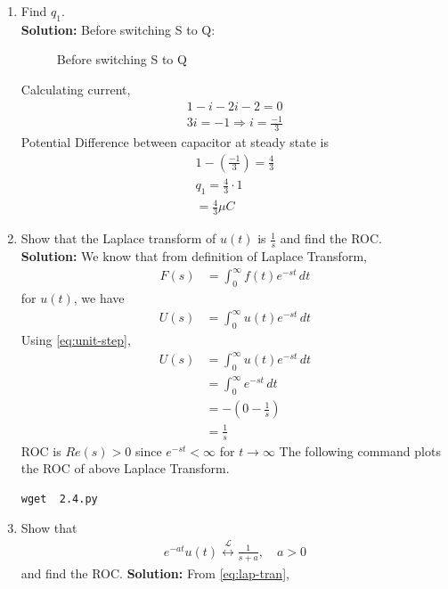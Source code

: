 \documentclass[journal,12pt,twocolumn]{IEEEtran}
\newcommand{\solution}{\noindent \textbf{Solution: }}
\providecommand{\brak}[1]{\ensuremath{\left(#1\right)}}
\providecommand{\system}[1]{\overset{\mathcal{#1}}{ \longleftrightarrow}}
\numberwithin{equation}{section}
\renewcommand\thesection{\arabic{section}}
\begin{document}
\begin{enumerate}[label=\arabic*.,ref=\thesection.\theenumi]
\item Find $q_1$.\\
\solution
Before switching S to Q:
\begin{figure}
%   
\caption{Before switching S to Q}
\end{figure}
Calculating current,
\begin{align}
1-i-2i-2=0\\
3i=-1 \Rightarrow i=\frac{-1}{3}
\end{align}
Potential Difference between capacitor at steady state is
\begin{align}
1-\brak{\frac{-1}{3}}=\frac{4}{3}\\
q_1=\frac{4}{3} \cdot 1\\
=\frac{4}{3} \mu C
\end{align}
	\item Show that the Laplace transform of $u(t)$ is $\frac{1}{s}$ and find the ROC.\\
	\solution We know that from definition of Laplace Transform,
	\begin{align}
	\label{eq:lap-tran}
	F(s)&= \int_{0}^{\infty} f(t)e^{-st} \,dt 
	\end{align}
	for $u(t)$, we have
	\begin{align}
		U(s)&=\int_{0}^{\infty} u(t)e^{-st} \,dt
	\end{align}
	Using \eqref{eq:unit-step},
	\begin{align}
	U(s)&=\int_{0}^{\infty} u(t)e^{-st} \,dt\\
	&=\int_{0}^{\infty} e^{-st} \,dt\\
	&=-\brak{0-\frac{1}{s}}\\
	&=\frac{1}{s}
	\end{align}
	ROC is $ Re(s)>0$ since $e^{-st}<\infty$ for $t \to \infty$
	The following command plots the ROC of above Laplace Transform.
	\begin{lstlisting}
wget  2.4.py	
\end{lstlisting}
	\begin{figure}[!ht]
			\centering
			\caption{}
			\label{fig:roc1}
\end{figure}
	\item Show that 
		\begin{align}
			e^{-at}u(t) \system{L} \frac{1}{s+a}, \quad a > 0
		\end{align}
		and find the ROC.
		\solution From \eqref{eq:lap-tran},
		\begin{align}

\end{align}
\end{enumerate}
\end{document}
